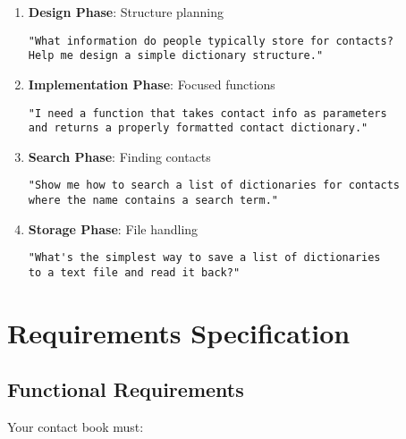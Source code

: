 \documentclass[
  letterpaper,
  DIV=11,
  numbers=noendperiod,
  oneside]{scrreprt}
\begin{document}
\begin{enumerate}
\def\labelenumi{\arabic{enumi}.}
\item
  \textbf{Design Phase}: Structure planning

\begin{verbatim}
"What information do people typically store for contacts? 
Help me design a simple dictionary structure."
\end{verbatim}
\item
  \textbf{Implementation Phase}: Focused functions

\begin{verbatim}
"I need a function that takes contact info as parameters 
and returns a properly formatted contact dictionary."
\end{verbatim}
\item
  \textbf{Search Phase}: Finding contacts

\begin{verbatim}
"Show me how to search a list of dictionaries for contacts 
where the name contains a search term."
\end{verbatim}
\item
  \textbf{Storage Phase}: File handling

\begin{verbatim}
"What's the simplest way to save a list of dictionaries 
to a text file and read it back?"
\end{verbatim}
\end{enumerate}

\section{Requirements Specification}\label{requirements-specification-5}

\subsection{Functional Requirements}\label{functional-requirements-5}

Your contact book must:
\end{document}
